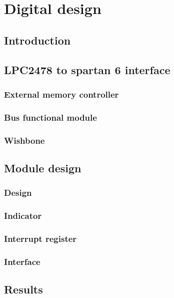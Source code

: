 \chapter{Digital design}
\section{Introduction}
%

\section{LPC2478 to spartan 6 interface}
%

\subsection{External memory controller}
\subsection{Bus functional module}
\subsection{Wishbone}
\section{Module design}
%

\subsection{Design}
\subsection{Indicator}
\subsection{Interrupt register}
\subsection{Interface}
\section{Results}
%



